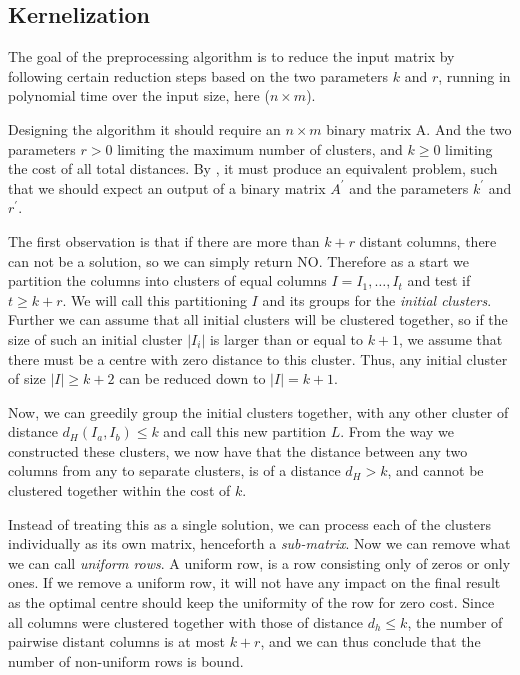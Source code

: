 \documentclass[a4paper]{article}
\begin{document}
\subsection{Kernelization}
\label{sec:algo:kernel}
The goal of the preprocessing algorithm is to reduce the input matrix by following certain reduction steps
based on the two parameters $k$ and $r$, running in polynomial time over the input size, here ($n \times m$).

Designing the algorithm it should require an $n \times m$ binary matrix A. And the two parameters $r > 0$ limiting the
maximum number of clusters, and $k \geq 0$ limiting the cost of all total distances. By , it must
produce an equivalent problem, such that we should expect an output of a binary matrix $A^\prime$ and the parameters $k^\prime$
and $r^\prime$.

The first observation is that if there are more than $k+r$ distant columns, there can not be a solution, so we can simply return NO.
Therefore as a start we partition the columns into clusters of equal columns $I = {I_1, \dots, I_t}$ and test if $t \ge k+r$.
We will call this partitioning $I$ and its groups for the \textit{initial clusters}. Further we can assume that all initial
clusters will be clustered together, so if the size of such an initial cluster $|I_i|$ is larger than or equal to $k+1$,
we assume that there must be a centre with zero distance to this cluster. Thus, any initial cluster of size $|I| \geq k+2$
can be reduced down to $|I| = k+1$.

Now, we can greedily group the initial clusters together, with any other cluster of distance $d_H(I_a,I_b) \leq k$ and call this new
partition $L$. From the way we constructed these clusters, we now have that the distance between any two columns from any to separate
clusters, is of a distance $d_H > k$, and cannot be clustered together within the cost of $k$.

Instead of treating this as a single solution, we can process each of the clusters individually as its own matrix, henceforth
a \textit{sub-matrix}. Now we can remove what we can call \textit{uniform rows}. A uniform row, is a row consisting
only of zeros or only ones. If we remove a uniform row, it will not have any impact on the final result as the optimal centre
should keep the uniformity of the row for zero cost. Since all columns were clustered together with those of distance $d_h \leq k$,
the number of pairwise distant columns is at most $k+r$, and we can thus conclude that the number of non-uniform rows is bound.
\end{document}

